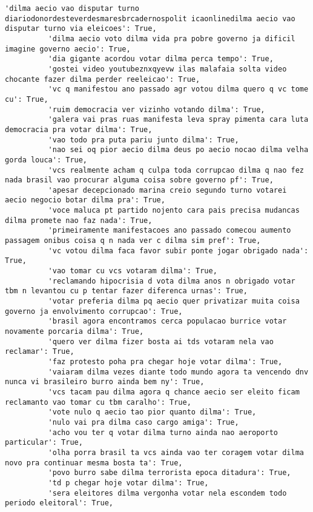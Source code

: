 \documentclass[11pt]{article}
\begin{document}
\begin{Verbatim}[commandchars=\\\{\}]
          'dilma aecio vao disputar turno diariodonordesteverdesmaresbrcadernospolit icaonlinedilma aecio vao disputar turno via eleicoes': True,
          'dilma aecio voto dilma vida pra pobre governo ja dificil imagine governo aecio': True,
          'dia gigante acordou votar dilma perca tempo': True,
          'gostei video youtubeznxqyevw ilas malafaia solta video chocante fazer dilma perder reeleicao': True,
          'vc q manifestou ano passado agr votou dilma quero q vc tome cu': True,
          'ruim democracia ver vizinho votando dilma': True,
          'galera vai pras ruas manifesta leva spray pimenta cara luta democracia pra votar dilma': True,
          'vao todo pra puta pariu junto dilma': True,
          'nao sei oq pior aecio dilma deus po aecio nocao dilma velha gorda louca': True,
          'vcs realmente acham q culpa toda corrupcao dilma q nao fez nada brasil vao procurar alguma coisa sobre governo pf': True,
          'apesar decepcionado marina creio segundo turno votarei aecio negocio botar dilma pra': True,
          'voce maluca pt partido nojento cara pais precisa mudancas dilma promete nao faz nada': True,
          'primeiramente manifestacoes ano passado comecou aumento passagem onibus coisa q n nada ver c dilma sim pref': True,
          'vc votou dilma faca favor subir ponte jogar obrigado nada': True,
          'vao tomar cu vcs votaram dilma': True,
          'reclamando hipocrisia d vota dilma anos n obrigado votar tbm n levantou cu p tentar fazer diferenca urnas': True,
          'votar preferia dilma pq aecio quer privatizar muita coisa governo ja envolvimento corrupcao': True,
          'brasil agora encontramos cerca populacao burrice votar novamente porcaria dilma': True,
          'quero ver dilma fizer bosta ai tds votaram nela vao reclamar': True,
          'faz protesto poha pra chegar hoje votar dilma': True,
          'vaiaram dilma vezes diante todo mundo agora ta vencendo dnv nunca vi brasileiro burro ainda bem ny': True,
          'vcs tacam pau dilma agora q chance aecio ser eleito ficam reclamanto vao tomar cu tbm caralho': True,
          'vote nulo q aecio tao pior quanto dilma': True,
          'nulo vai pra dilma caso cargo amiga': True,
          'acho vou ter q votar dilma turno ainda nao aeroporto particular': True,
          'olha porra brasil ta vcs ainda vao ter coragem votar dilma novo pra continuar mesma bosta ta': True,
          'povo burro sabe dilma terrorista epoca ditadura': True,
          'td p chegar hoje votar dilma': True,
          'sera eleitores dilma vergonha votar nela escondem todo periodo eleitoral': True,

\end{Verbatim}
\end{document}
